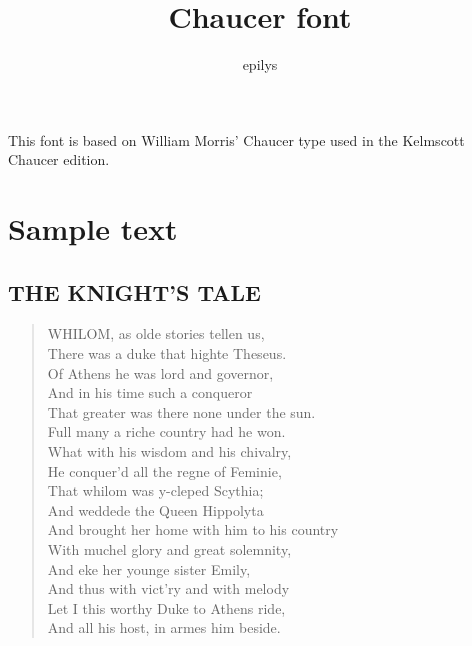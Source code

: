 \documentclass{article}
\title{Chaucer font}
\author{epilys}
\begin{document}
\maketitle
This font is based on William Morris' Chaucer type used in the Kelmscott Chaucer edition.

\section{Sample text}

\subsection{\textsection{}\thinspace{}THE KNIGHT'S TALE}
\begin{verse}
WHILOM, as olde stories tellen us,\\
There was a duke that highte Theseus.\\
Of Athens he was lord and governor,\\
And in his time such a conqueror\\
That greater was there none under the sun.\\
Full many a riche country had he won.\\
What with his wisdom and his chivalry,\\
He conquer'd all the regne of Feminie,\\
That whilom was y-cleped Scythia;\\
And weddede the Queen Hippolyta\\
And brought her home with him to his country\\
With muchel glory and great solemnity,\\
And eke her younge sister Emily,\\
And thus with vict'ry and with melody\\
Let I this worthy Duke to Athens ride,\\
And all his host, in armes him beside.
\end{verse}
\end{document}
